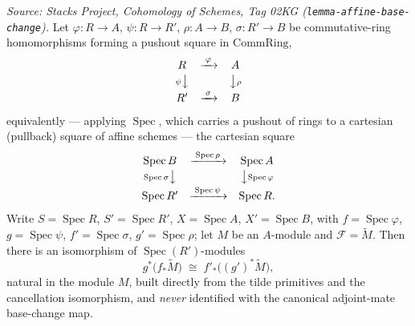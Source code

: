 \begin{lemma}\leanok
  \label{lem:affine_pushforward_pullback_baseChange}
  \textit{Source: Stacks Project, Cohomology of Schemes, Tag 02KG
  (\texttt{lemma-affine-base-change}).}
  Let \(\varphi : R \to A\), \(\psi : R \to R'\), \(\rho : A \to B\),
  \(\sigma : R' \to B\) be commutative-ring homomorphisms forming a pushout square in
  \(\mathrm{CommRing}\),
  \[
    \begin{array}{ccc}
      R & \xrightarrow{\;\varphi\;} & A \\[2pt]
      {\scriptstyle \psi}\big\downarrow & & \big\downarrow{\scriptstyle \rho} \\[2pt]
      R' & \xrightarrow{\;\sigma\;} & B
    \end{array}
  \]
  equivalently --- applying \(\operatorname{Spec}\), which carries a pushout of rings to
  a cartesian (pullback) square of affine schemes --- the cartesian square
  \[
    \begin{array}{ccc}
      \operatorname{Spec} B & \xrightarrow{\;\operatorname{Spec}\rho\;}
        & \operatorname{Spec} A \\[2pt]
      {\scriptstyle \operatorname{Spec}\sigma}\big\downarrow & &
        \big\downarrow{\scriptstyle \operatorname{Spec}\varphi} \\[2pt]
      \operatorname{Spec} R' & \xrightarrow{\;\operatorname{Spec}\psi\;}
        & \operatorname{Spec} R .
    \end{array}
  \]
  Write \(S = \operatorname{Spec} R\), \(S' = \operatorname{Spec} R'\),
  \(X = \operatorname{Spec} A\), \(X' = \operatorname{Spec} B\), with
  \(f = \operatorname{Spec}\varphi\), \(g = \operatorname{Spec}\psi\),
  \(f' = \operatorname{Spec}\sigma\), \(g' = \operatorname{Spec}\rho\); let \(M\) be an
  \(A\)-module and \(\mathcal{F} = \widetilde{M}\). Then there is an isomorphism of
  \(\operatorname{Spec}(R')\)-modules
  \[
    g^*\bigl(f_*\widetilde{M}\bigr)
    \;\cong\;
    f'_*\bigl((g')^*\widetilde{M}\bigr),
  \]
  natural in the module \(M\), built directly from the tilde primitives and the
  cancellation isomorphism, and \emph{never} identified with the canonical
  adjoint-mate base-change map.

\end{lemma}

